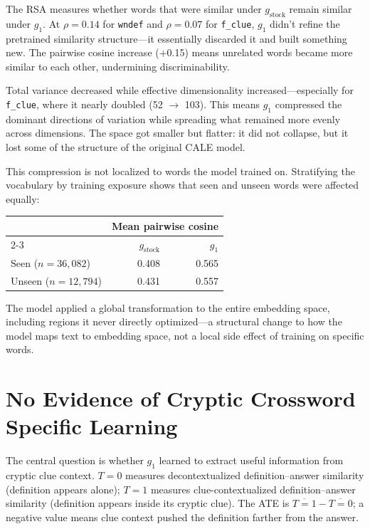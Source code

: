 \documentclass[11pt]{article}
\begin{document}
The RSA measures whether words that were similar under $g_\text{stock}$ remain
similar under $g_1$. At $\rho = 0.14$ for \texttt{wndef} and $\rho = 0.07$ for
\texttt{f\_clue}, $g_1$ didn't refine the pretrained similarity
structure---it essentially discarded it and built something new. The pairwise
cosine increase (+0.15) means unrelated words became more similar to each
other, undermining discriminability.

Total variance decreased while effective dimensionality increased---especially
for \texttt{f\_clue}, where it nearly doubled (52 $\to$ 103). This means $g_1$
compressed the dominant directions of variation while spreading what remained
more evenly across dimensions. The space got smaller but flatter: it did not collapse, 
but it lost some of the structure of the original CALE model.

This compression is not localized to words the model trained on. Stratifying
the vocabulary by training exposure shows that seen and unseen words were
affected equally:

\begin{table}[h]
\centering
\begin{tabular}{lrr}
\toprule
& \multicolumn{2}{c}{Mean pairwise cosine} \\
\cmidrule(lr){2-3}
& $g_\text{stock}$ & $g_1$ \\
\midrule
Seen ($n = 36{,}082$) & 0.408 & 0.565 \\
Unseen ($n = 12{,}794$) & 0.431 & 0.557 \\
\bottomrule
\end{tabular}
\end{table}

The model applied a global transformation to the entire embedding space,
including regions it never directly optimized---a structural change to how
the model maps text to embedding space, not a local side effect of training
on specific words.

\section*{No Evidence of Cryptic Crossword Specific Learning}

The central question is whether $g_1$ learned to extract useful information
from cryptic clue context. $T\!=\!0$ measures decontextualized
definition--answer similarity (definition appears alone); $T\!=\!1$ measures
clue-contextualized definition--answer similarity (definition appears inside
its cryptic clue). The ATE is $\overline{T\!=\!1} -
\overline{T\!=\!0}$; a negative value means clue context pushed the definition 
farther from the answer.
\end{document}
